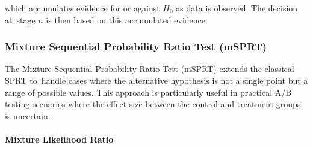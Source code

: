 \documentclass[magisterska, english]{pwr_wmat_praca_dyplomowa}
\theoremstyle{plain}
\newtheorem{theorem}{Theorem}
\numberwithin{theorem}{chapter}
\theoremstyle{definition}
\numberwithin{theorem}{chapter}
\newcommand{\myparagraph}[1]{\paragraph{#1}\mbox{}\\}
\begin{document}
which accumulates evidence for or against \( H_0 \) as data is observed. The decision at~stage \( n \) is then based on this accumulated evidence.

%
%


%
%
%

\subsubsection{Mixture Sequential Probability Ratio Test (mSPRT)}

The Mixture Sequential Probability Ratio Test (mSPRT) extends the classical SPRT to~handle cases where the alternative hypothesis is not a single point but a range of possible values. This approach is particularly useful in practical A/B testing scenarios where the effect size between the control and treatment groups is uncertain.

\myparagraph{Mixture Likelihood Ratio}
\end{document}
